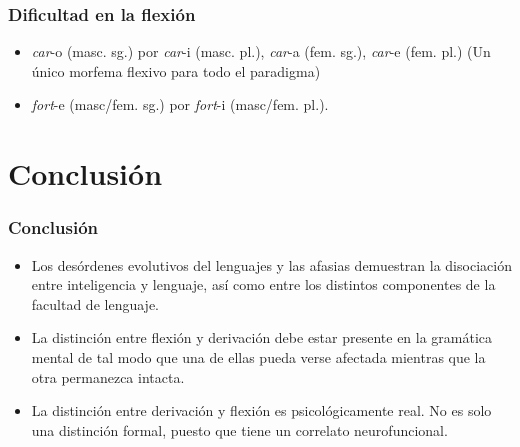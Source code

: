 \documentclass[compress]{beamer}
\begin{document}
	\begin{frame}
	\frametitle{Dificultad en la flexión}


	\begin{itemize}
	\item \emph{car}-\alert{o} (masc. sg.) por \emph{car}-\alert{i} (masc.
	pl.), \emph{car}-\alert{a} (fem. sg.), \emph{car}-\alert{e} (fem.
	pl.) (Un único morfema flexivo para todo el paradigma)
	\item \emph{fort}-\alert{e} (masc/fem. sg.) por \emph{fort}-\alert{i} (masc/fem. pl.).
	\end{itemize}

	\end{frame}

	\section{Conclusión}

	\begin{frame}
	\frametitle{Conclusión}
	\begin{itemize}
	\item Los desórdenes evolutivos del lenguajes y las afasias demuestran la disociación entre inteligencia y lenguaje, así como entre los distintos componentes de la facultad de lenguaje.  
	\item  La distinción entre flexión y derivación debe estar presente
	en la gramática mental de tal modo que una de ellas pueda verse
	afectada mientras que la otra permanezca intacta.
	  \item La distinción entre derivación y flexión es
	psicológicamente real. No es solo una distinción formal, puesto que
	tiene un correlato neurofuncional.
	\end{itemize}



	\end{frame}
    
\end{document}
